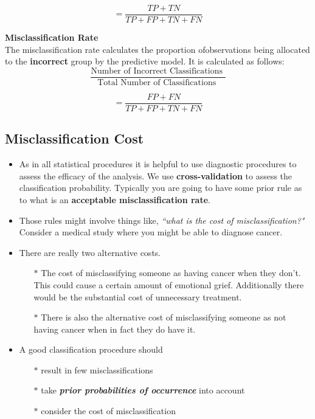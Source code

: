 \documentclass[a4paper,12pt]{article}
\begin{document}
\[ = \frac{TP + TN}{TP+FP+TN+FN}\]

\medskip

\noindent \textbf{Misclassification Rate}\\
The misclassification rate calculates the proportion ofobservations being allocated to the \textbf{incorrect} group by the predictive model. It is calculated as follows:
\[ \frac{
\mbox{Number of Incorrect Classifications }}{\mbox{Total Number of Classifications }} \]

\[ = \frac{FP + FN}{TP+FP+TN+FN}\]
\newpage

\subsection{Misclassification Cost}
\begin{itemize}
	\item As in all statistical procedures it is helpful to use diagnostic procedures to assess the efficacy of the analysis. We use \textbf{cross-validation} to assess the classification probability.
	Typically you are going to have some prior rule as to what is an \textbf{acceptable misclassification rate}.
	
	\item	Those rules might involve things like, \textit{``what is the cost of misclassification?"} Consider a medical study where you might be able to diagnose cancer.
	
	\item There are really two alternative costs. 
	\begin{itemize}
		\item[$\ast$] The cost of misclassifying someone as having cancer when they don't.
	This could cause a certain amount of emotional grief. Additionally there would be the substantial cost of unnecessary treatment.
	
	\item[$\ast$] There is also the alternative cost of misclassifying someone as not having cancer when in fact they do have it.
	\end{itemize}
	\item A good classification procedure should
	\begin{itemize}
		\item[$\ast$] result in few misclassifications
		\item[$\ast$] take \textbf{\textit{prior probabilities of occurrence}} into account
		\item[$\ast$] consider the cost of misclassification
	\end{itemize}
	

\end{itemize}
\end{document}
